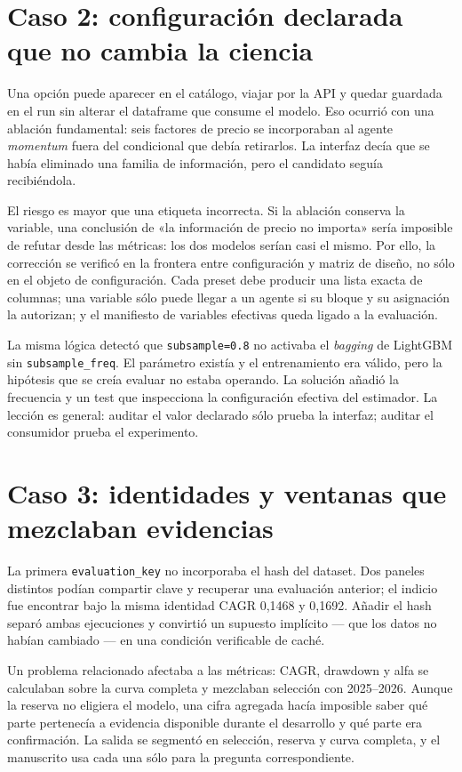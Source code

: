 \section{Caso 2: configuración declarada que no cambia la ciencia}

Una opción puede aparecer en el catálogo, viajar por la API y quedar guardada en el run sin alterar
el dataframe que consume el modelo. Eso ocurrió con una ablación fundamental: seis factores de
precio se incorporaban al agente \textit{momentum} fuera del condicional que debía retirarlos. La
interfaz decía que se había eliminado una familia de información, pero el candidato seguía
recibiéndola.

El riesgo es mayor que una etiqueta incorrecta. Si la ablación conserva la variable, una conclusión
de «la información de precio no importa» sería imposible de refutar desde las métricas: los dos
modelos serían casi el mismo. Por ello, la corrección se verificó en la frontera entre configuración
y matriz de diseño, no sólo en el objeto de configuración. Cada preset debe producir una lista
exacta de columnas; una variable sólo puede llegar a un agente si su bloque y su asignación la
autorizan; y el manifiesto de variables efectivas queda ligado a la evaluación.

La misma lógica detectó que \texttt{subsample=0.8} no activaba el \textit{bagging} de LightGBM sin
\texttt{subsample\_freq}. El parámetro existía y el entrenamiento era válido, pero la hipótesis que
se creía evaluar no estaba operando. La solución añadió la frecuencia y un test que inspecciona la
configuración efectiva del estimador. La lección es general: auditar el valor declarado sólo prueba
la interfaz; auditar el consumidor prueba el experimento.

\section{Caso 3: identidades y ventanas que mezclaban evidencias}

La primera \texttt{evaluation\_key} no incorporaba el hash del dataset. Dos paneles distintos podían
compartir clave y recuperar una evaluación anterior; el indicio fue encontrar bajo la misma
identidad CAGR 0,1468 y 0,1692. Añadir el hash separó ambas ejecuciones y convirtió un supuesto
implícito --- que los datos no habían cambiado --- en una condición verificable de caché.

Un problema relacionado afectaba a las métricas: CAGR, drawdown y alfa se calculaban sobre la curva
completa y mezclaban selección con 2025--2026. Aunque la reserva no eligiera el modelo, una cifra
agregada hacía imposible saber qué parte pertenecía a evidencia disponible durante el desarrollo y
qué parte era confirmación. La salida se segmentó en selección, reserva y curva completa, y el
manuscrito usa cada una sólo para la pregunta correspondiente.

